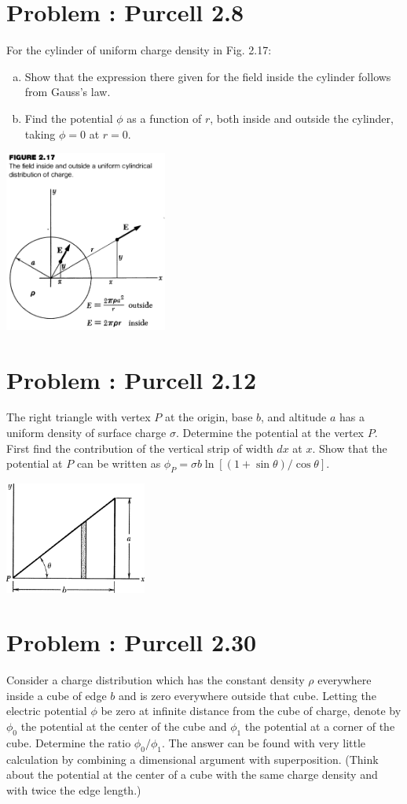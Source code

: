 \documentclass[problems]{esg8022pset}
\begin{document}
\section{Problem \thesection: Purcell 2.8}
  For the cylinder of uniform charge density in Fig. 2.17:
  \begin{enumerate}[(a)]
    \item Show that the expression there given for the field inside the cylinder follows from Gauss's law.
    \item Find the potential $\phi$ as a function of $r$, both inside and outside the cylinder, taking $\phi = 0$ at $r = 0$.
  \end{enumerate}
  \begin{center}\includegraphics[width=0.4\textwidth]{ps02_2}\end{center}
\section{Problem \thesection: Purcell 2.12}
  The right triangle with vertex $P$ at the origin, base $b$, and altitude $a$ has a uniform density of surface charge $\sigma$. Determine the potential at the vertex $P$. First find the contribution of the vertical strip of width $dx$ at $x$. Show that the potential at $P$ can be written as $\phi_P = \sigma b \ln[(1 + \sin \theta) / \cos \theta]$.
  \begin{center}\includegraphics[width=0.35\textwidth]{ps02_3}\end{center}
\section{Problem \thesection: Purcell 2.30}
  Consider a charge distribution which has the constant density $\rho$ everywhere inside a cube of edge $b$ and is zero everywhere outside that cube. Letting the electric potential $\phi$ be zero at infinite distance from the cube of charge, denote by $\phi_0$ the potential at the center of the cube and $\phi_1$ the potential at a corner of the cube. Determine the ratio $\phi_0/\phi_1$. The answer can be found with very little calculation by combining a dimensional argument with superposition. (Think about the potential at the center of a cube with the same charge density and with twice the edge length.)
\end{document}
